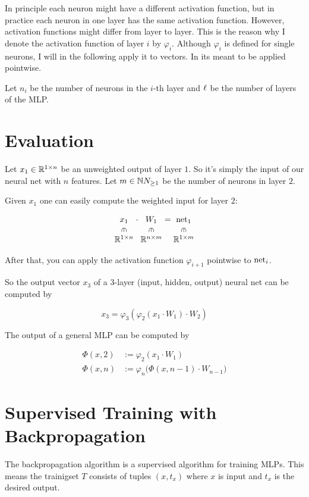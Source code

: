 In principle each neuron might have a different activation function, but in
practice each neuron in one layer has the same activation function. However,
activation functions might differ from layer to layer. This is the reason why
I denote the activation function of layer $i$ by $\varphi_i$. Although $\varphi_i$
is defined for single neurons, I will in the following apply it to vectors. In
its meant to be applied pointwise.

Let $n_i$ be the number of neurons in the $i$-th layer and ${\ell}$ be the number of layers of the
\gls{MLP}.

\section{Evaluation}
Let $x_1 \in \mathbb{R}^{1 \times n}$ be an unweighted output of layer $1$. So it's
simply the input of our neural net with $n$ features. Let 
$m \in \mathbb{N}{N}_{\geq 1}$ be the number of neurons in layer $2$.

Given $x_1$ one can easily compute the weighted input for layer $2$:

\[
\begin{array}{@{}c@{\;}c@{\;}c@{\;}c@{\;}c@{}}
x_1 & \cdot & W_{1} & = & \net_1 \\
\vin && \vin && \vin \\
\mathbb{R}^{1\times n} && \mathbb{R}^{n\times m} && \mathbb{R}^{1\times m}
\end{array}
\]

After that, you can apply the activation function $\varphi_{i+1}$ pointwise
to $\mathrm{net}_i$. %

So the output vector $x_3$ of a 3-layer (input, hidden, output) neural net can be
computed by

\[x_3 = \varphi_3(\varphi_2(x_1 \cdot W_{1}) \cdot W_{2})\]

The output of a general \gls{MLP} can be computed by

\begin{align*}
    \Phi(x, 2) &:= \varphi_{2}(x_1 \cdot W_{1})\\
    \Phi(x, n) &:= \varphi_{n} \big (\Phi(x, n-1) \cdot W_{n-1} \big)
\end{align*}

\section{Supervised Training with Backpropagation}\label{sec:training}
The backpropagation algorithm is a supervised algorithm for training
\glspl{MLP}. This means the trainigset $T$ consists of tuples $(x, t_x)$
where $x$ is input and $t_x$ is the desired output.

